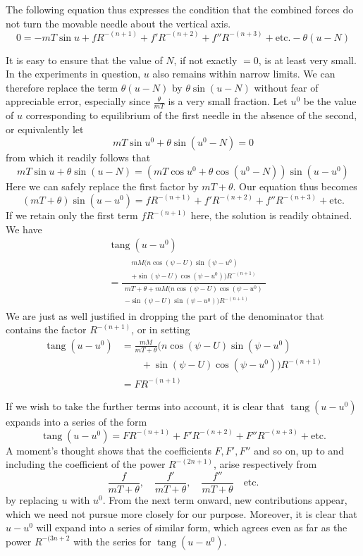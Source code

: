 The following equation thus expresses the condition that the combined forces do not turn the movable needle about the vertical axis.
\[
0=-mT\sin u+fR^{-(n+1)}+f'R^{-(n+2)}+f''R^{-(n+3)}+\text{etc.}-\theta(u-N)
\]

It is easy to ensure that the value of $N$, if not exactly $=0$, is at least very small. In the experiments in question, $u$ also remains within narrow limits. We can therefore replace the term $\theta(u-N)$ by $\theta\sin(u-N)$ without fear of appreciable error, especially since $\frac{\theta}{mT}$ is a very small fraction. Let $u^0$ be the value of $u$ corresponding to equilibrium of the first needle in the absence of the second, or equivalently let
\[
mT\sin u^0+\theta\sin(u^0-N)=0
\]
from which it readily follows that
\[
mT\sin u+\theta\sin(u-N)=(mT\cos u^0+\theta\cos(u^0-N))\sin(u-u^0)
\]
Here we can safely replace the first factor by $mT+\theta$. Our equation thus becomes
\[
(mT+\theta)\sin(u-u^0)=fR^{-(n+1)}+f'R^{-(n+2)}+f''R^{-(n+3)}+\text{etc.}
\]
If we retain only the first term $fR^{-(n+1)}$ here, the solution is readily obtained. We have
\[
\begin{aligned}
&\operatorname{tang}(u-u^0)\\
&=\frac{\begin{gathered}mM(n\cos(\psi-U)\sin(\psi-u^0)\\+\sin(\psi-U)\cos(\psi-u^0))R^{-(n+1)}\end{gathered}}{\begin{gathered}mT+\theta+mM(n\cos(\psi-U)\cos(\psi-u^0)\\-\sin(\psi-U)\sin(\psi-u^0))R^{-(n+1)}\end{gathered}}
\end{aligned}
\]
We are just as well justified in dropping the part of the denominator that contains the factor $R^{-(n+1)}$, or in setting
\[
\begin{aligned}
\operatorname{tang}(u-u^0)&=\frac{mM}{mT+\theta}(n\cos(\psi-U)\sin(\psi-u^0)\\
&\qquad+\sin(\psi-U)\cos(\psi-u^0))R^{-(n+1)}\\
&=FR^{-(n+1)}
\end{aligned}
\]

If we wish to take the further terms into account, it is clear that $\operatorname{tang}(u-u^0)$ expands into a series of the form
\[
\operatorname{tang}(u-u^0)=FR^{-(n+1)}+F'R^{-(n+2)}+F''R^{-(n+3)}+\text{etc.}
\]
A moment's thought shows that the coefficients $F,F',F''$ and so on, up to and including the coefficient of the power $R^{-(2n+1)}$, arise respectively from
\[
\frac{f}{mT+\theta},\quad\frac{f'}{mT+\theta},\quad\frac{f''}{mT+\theta}\quad\text{etc.}
\]
by replacing $u$ with $u^0$. From the next term onward, new contributions appear, which we need not pursue more closely for our purpose. Moreover, it is clear that $u-u^0$ will expand into a series of similar form, which agrees even as far as the power $R^{-(3n+2}$ with the series for $\operatorname{tang}(u-u^0)$.

